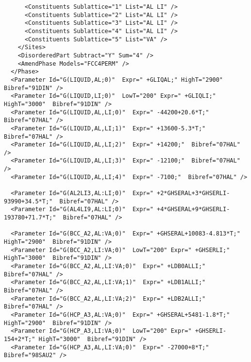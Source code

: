 \documentclass{article}
\begin{document}
\begin{appendices}
\begin{verbatim}
      <Constituents Sublattice="1" List="AL LI" />
      <Constituents Sublattice="2" List="AL LI" />
      <Constituents Sublattice="3" List="AL LI" />
      <Constituents Sublattice="4" List="AL LI" />
      <Constituents Sublattice="5" List="VA" />
    </Sites>
    <DisorderedPart Subtract="Y" Sum="4" />
    <AmendPhase Models="FCC4PERM" />
  </Phase>
  <Parameter Id="G(LIQUID,AL;0)"  Expr=" +GLIQAL;" HighT="2900"  Bibref="91DIN" />
  <Parameter Id="G(LIQUID,LI;0)"  LowT="200" Expr=" +GLIQLI;" HighT="3000"  Bibref="91DIN" />
  <Parameter Id="G(LIQUID,AL,LI;0)"  Expr=" -44200+20.6*T;"  Bibref="07HAL" />
  <Parameter Id="G(LIQUID,AL,LI;1)"  Expr=" +13600-5.3*T;"  Bibref="07HAL" />
  <Parameter Id="G(LIQUID,AL,LI;2)"  Expr=" +14200;"  Bibref="07HAL" />
  <Parameter Id="G(LIQUID,AL,LI;3)"  Expr=" -12100;"  Bibref="07HAL" />
  <Parameter Id="G(LIQUID,AL,LI;4)"  Expr=" -7100;"  Bibref="07HAL" />

  <Parameter Id="G(AL2LI3,AL:LI;0)"  Expr=" +2*GHSERAL+3*GHSERLI-93990+34.5*T;"  Bibref="07HAL" />
  <Parameter Id="G(AL4LI9,AL:LI;0)"  Expr=" +4*GHSERAL+9*GHSERLI-193780+71.7*T;"  Bibref="07HAL" />

  <Parameter Id="G(BCC_A2,AL:VA;0)"  Expr=" +GHSERAL+10083-4.813*T;" HighT="2900"  Bibref="91DIN" />
  <Parameter Id="G(BCC_A2,LI:VA;0)"  LowT="200" Expr=" +GHSERLI;" HighT="3000"  Bibref="91DIN" />
  <Parameter Id="G(BCC_A2,AL,LI:VA;0)"  Expr=" +LDB0ALLI;"  Bibref="07HAL" />
  <Parameter Id="G(BCC_A2,AL,LI:VA;1)"  Expr=" +LDB1ALLI;"  Bibref="07HAL" />
  <Parameter Id="G(BCC_A2,AL,LI:VA;2)"  Expr=" +LDB2ALLI;"  Bibref="07HAL" />
  <Parameter Id="G(HCP_A3,AL:VA;0)"  Expr=" +GHSERAL+5481-1.8*T;" HighT="2900"  Bibref="91DIN" />
  <Parameter Id="G(HCP_A3,LI:VA;0)"  LowT="200" Expr=" +GHSERLI-154+2*T;" HighT="3000"  Bibref="91DIN" />
  <Parameter Id="G(HCP_A3,AL,LI:VA;0)"  Expr=" -27000+8*T;"  Bibref="98SAU2" />


\end{verbatim}
\end{appendices}
\end{document}
